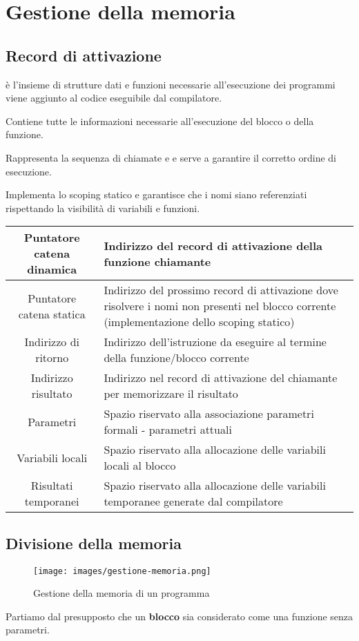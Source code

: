 \newpage
\section{Gestione della memoria}
\subsection{Record di attivazione}
\begin{definition}
	è l'insieme di strutture dati e funzioni necessarie all'esecuzione dei programmi viene aggiunto al codice eseguibile dal compilatore.
\end{definition}
\begin{definition}
	Contiene tutte le informazioni necessarie all'esecuzione del blocco o della funzione.
\end{definition}
\begin{definition}
	Rappresenta la sequenza di chiamate e e serve a garantire il corretto ordine di esecuzione.
\end{definition}
\begin{definition}
	Implementa lo scoping statico e garantisce che i nomi siano referenziati rispettando la visibilità di variabili e funzioni.
\end{definition}
\begin{tabular} { |c|p{250px}|}
	\hline
	Puntatore catena dinamica  & Indirizzo del record di attivazione della funzione chiamante\\
	\hline
	Puntatore catena statica & Indirizzo del prossimo record di attivazione dove risolvere i nomi
		non presenti nel blocco corrente (implementazione dello scoping
		statico) \\
	\hline
	Indirizzo di ritorno & Indirizzo dell’istruzione da eseguire al termine della funzione/blocco corrente \\
	\hline
	Indirizzo risultato & Indirizzo nel record di attivazione del chiamante per memorizzare il risultato \\
	\hline
	Parametri & Spazio riservato alla associazione parametri formali - parametri attuali \\
	\hline
	Variabili locali & Spazio riservato alla allocazione delle variabili locali al blocco \\
	\hline
	Risultati temporanei & Spazio riservato alla allocazione delle variabili temporanee generate dal compilatore \\
	\hline
\end{tabular}
\subsection{Divisione della memoria}
\begin{figure}[h!]
	\centering
	\texttt{[image: images/gestione-memoria.png]}
	\caption{Gestione della memoria di un programma}
\end{figure}
\begin{note}
	Partiamo dal presupposto che un \textbf{blocco} sia considerato come una funzione senza parametri.
\end{note}